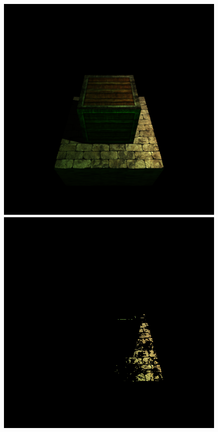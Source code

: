 \documentclass[format=sigconf]{acmart}
\begin{document}
\begin{figure}[H]
  \begin{center}
    \begin{minipage}{.2\textwidth}
      \includegraphics[width=1.0\textwidth]{pipeline-lighting.png}
    \end{minipage}
    \begin{minipage}{.2\textwidth}
      \includegraphics[width=1.0\textwidth]{pipeline-highpass.png}

\end{minipage}
\end{center}
\end{figure}
\end{document}
